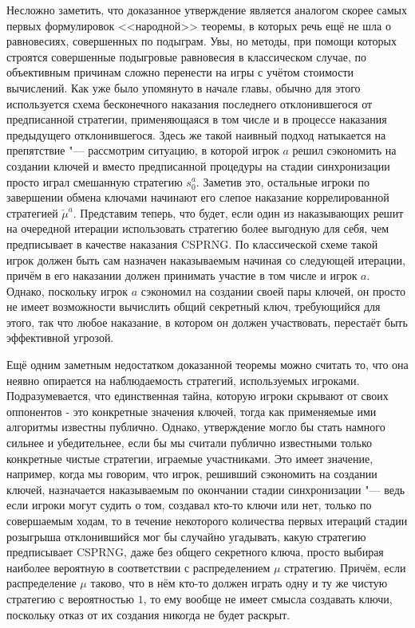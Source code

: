 Несложно заметить, что доказанное утверждение является аналогом скорее самых первых формулировок <<народной>> теоремы, в которых речь ещё не шла о равновесиях, совершенных по подыграм. Увы, но методы, при помощи которых строятся совершенные подыгровые равновесия в классическом случае, по объективным причинам сложно перенести на игры с учётом стоимости вычислений. Как уже было упомянуто в начале главы, обычно для этого используется схема бесконечного наказания последнего отклонившегося от предписанной стратегии, применяющаяся в том числе и в процессе наказания предыдущего отклонившегося. Здесь же такой наивный подход натыкается на препятствие "--- рассмотрим ситуацию, в которой игрок $a$ решил сэкономить на создании ключей и вместо предписанной процедуры на стадии синхронизации просто играл смешанную стратегию $s_0^a$. Заметив это, остальные игроки по завершении обмена ключами начинают его слепое наказание коррелированной стратегией $\check{\mu}^a$. Представим теперь, что будет, если один из наказывающих решит на очередной итерации использовать стратегию более выгодную для себя, чем предписывает в качестве наказания CSPRNG. По классической схеме такой игрок должен быть сам назначен наказываемым начиная со следующей итерации, причём в его наказании должен принимать участие в том числе и игрок $a$. Однако, поскольку игрок $a$ сэкономил на создании своей пары ключей, он просто не имеет возможности вычислить общий секретный ключ, требующийся для этого, так что любое наказание, в котором он должен участвовать, перестаёт быть эффективной угрозой.

Ещё одним заметным недостатком доказанной теоремы можно считать то, что она неявно опирается на наблюдаемость стратегий, используемых игроками. Подразумевается, что единственная тайна, которую игроки скрывают от своих оппонентов - это конкретные значения ключей, тогда как применяемые ими алгоритмы известны публично. Однако, утверждение могло бы стать намного сильнее и убедительнее, если бы мы считали публично известными только конкретные чистые стратегии, играемые участниками. Это имеет значение, например, когда мы говорим, что игрок, решивший сэкономить на создании ключей, назначается наказываемым по окончании стадии синхронизации "--- ведь если игроки могут судить о том, создавал кто-то ключи или нет, только по совершаемым ходам, то в течение некоторого количества первых итераций стадии розыгрыша отклонившийся мог бы случайно угадывать, какую стратегию предписывает CSPRNG, даже без общего секретного ключа, просто выбирая наиболее вероятную в соответствии с распределением $\mu$ стратегию. Причём, если распределение $\mu$ таково, что в нём кто-то должен играть одну и ту же чистую стратегию с вероятностью $1$, то ему вообще не имеет смысла создавать ключи, поскольку отказ от их создания никогда не будет раскрыт.

